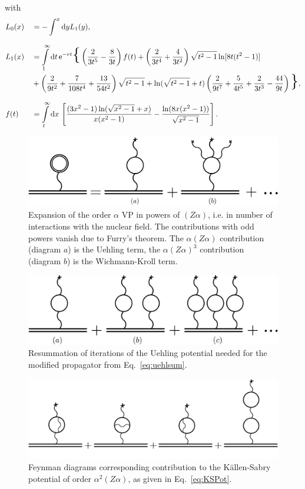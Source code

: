 with
\begin{alignat}{2}
&L_0(x)&&=-\int^x\text{d}yL_1(y),\\[7.5pt]
&L_1(x) &&= \int\limits_1^\infty\text{d}t\,\e^{-rt}\text{\huge\{}
\left(\frac{2}{3t^5}-\frac{8}{3t}\right)f(t)
+\left(\frac{2}{3t^4}+\frac{4}{3t^2}\right)\sqrt{t^2-1}\ln[8t(t^2-1)]\\
&&&+\left(\frac{2}{9t^2}+\frac{7}{108t^4}+\frac{13}{54t^2}\right)\sqrt{t^2-1}
+\ln (\sqrt{t^2-1}+t)\left(\frac{2}{9t^7}+\frac{5}{4t^5}+\frac{2}{3t^3}-\frac{44}{9t}\right)
\text{\huge\}},\\[7.5pt]
&f(t) &&= \int\limits_t^\infty\text{d}x\,
\left[
\frac{(3x^2-1)\ln (\sqrt{x^2-1}+x)}{x(x^2-1)}-
\frac{\ln(8x(x^2-1))}{\sqrt{x^2-1}}
\right].
\end{alignat}
%
\begin{figure}%
\centering
\includegraphics[width=0.75\linewidth]{pics/vac_pol_wk.pdf}%
\caption{Expansion of the order $\alpha$ VP in powers of $(Z\alpha)$, i.e. in number of interactions with the nuclear field. The contributions with odd powers vanish due to Furry's theorem. The $\alpha(Z\alpha)$ contribution (diagram $a$) is the Uehling term, the $\alpha(Z\alpha)^3$ contribution (diagram $b$) is the Wichmann-Kroll term.}%
\label{fig:vac_pol_wk}%
\end{figure}
%
%
\begin{figure}%
\centering
\includegraphics[width=0.8\linewidth]{pics/vac_pol_uehl.pdf}%
\caption{Resummation of iterations of the Uehling potential needed for the modified propagator from Eq.~\eqref{eq:uehlsum}.}%
\label{fig:vac_pol_uehl}%
\end{figure}
%
%
\begin{figure}%
\centering
\includegraphics[width=0.9\linewidth]{pics/vac_pol_ks.pdf}%
\caption{Feynman diagrams corresponding contribution to the Källen-Sabry potential of order $\alpha^2(Z\alpha)$, as given in Eq.~\eqref{eq:KSPot}.}%
\label{fig:vac_pol_ks}%
\end{figure}
%
